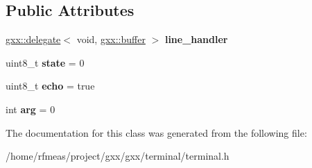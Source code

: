 \subsection*{Public Attributes}
\begin{DoxyCompactItemize}
\item 
\hyperlink{classgxx_1_1delegate}{gxx\+::delegate}$<$ void, \hyperlink{classgxx_1_1buffer}{gxx\+::buffer} $>$ {\bfseries line\+\_\+handler}\hypertarget{classgxx_1_1terminal__core_a6010d235dfa06dcbd9f9a5e6d4bf75d5}{}\label{classgxx_1_1terminal__core_a6010d235dfa06dcbd9f9a5e6d4bf75d5}

\item 
uint8\+\_\+t {\bfseries state} = 0\hypertarget{classgxx_1_1terminal__core_acdefbea253ae4ed94a4ae7035436eac9}{}\label{classgxx_1_1terminal__core_acdefbea253ae4ed94a4ae7035436eac9}

\item 
uint8\+\_\+t {\bfseries echo} = true\hypertarget{classgxx_1_1terminal__core_acff3106e618349fea0809e7cbce831f9}{}\label{classgxx_1_1terminal__core_acff3106e618349fea0809e7cbce831f9}

\item 
int {\bfseries arg} = 0\hypertarget{classgxx_1_1terminal__core_ad2060570ce7e5ba07135457a423c80ab}{}\label{classgxx_1_1terminal__core_ad2060570ce7e5ba07135457a423c80ab}

\end{DoxyCompactItemize}


The documentation for this class was generated from the following file\+:\begin{DoxyCompactItemize}
\item 
/home/rfmeas/project/gxx/gxx/terminal/terminal.\+h\end{DoxyCompactItemize}
